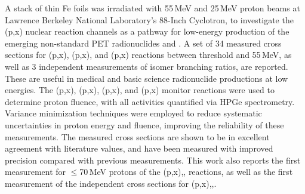A stack  of thin Fe 
foils was irradiated with  55\,MeV and 25\,MeV proton beams at Lawrence Berkeley National Laboratory's 88-Inch Cyclotron,  to investigate the (p,x)  nuclear reaction channels as a  pathway for low-energy production of the emerging non-standard PET radionuclides  and .
A set of 34 measured  cross sections for  (p,x), (p,x), and  (p,x) reactions between threshold and 55\,MeV, as well as 3 independent measurements of isomer branching ratios, are reported. 
These are useful in medical and basic science radionuclide productions at low energies. 
The
(p,x), (p,x), (p,x), and (p,x) monitor  reactions were used to
determine proton fluence, with all activities  quantified via HPGe spectrometry.
Variance minimization techniques were employed to reduce systematic uncertainties in proton energy and fluence, improving the reliability of these measurements. 
The measured cross sections are shown to be in excellent agreement with  literature values, and have been measured with improved precision compared with previous measurements.
This work also reports the first measurement for $\leq$70\,MeV protons  of the  
(p,x),, reactions, as well as the first measurement of the independent cross sections for    (p,x),,.
